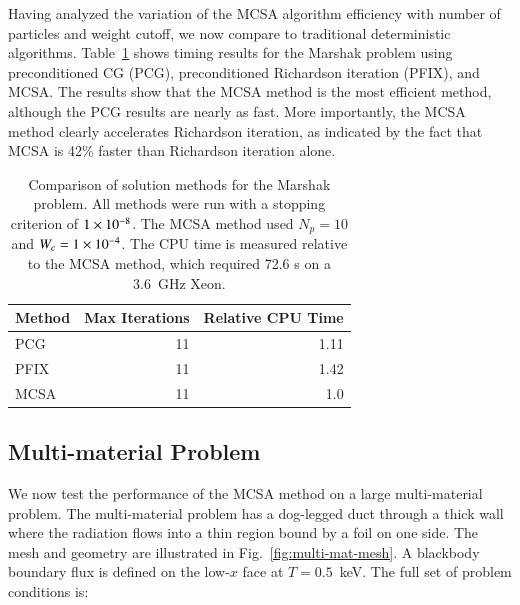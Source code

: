 \documentclass[preprint,12pt]{elsarticle}
\begin{document}
Having analyzed the variation of the MCSA algorithm efficiency with
number of particles and weight cutoff, we now compare to traditional
deterministic algorithms.  Table~\ref{tab:marshak_comparison} shows
timing results for the Marshak problem using preconditioned CG (PCG),
preconditioned Richardson iteration (PFIX), and MCSA. The results show
that the MCSA method is the most efficient method, although the PCG
results are nearly as fast.  More importantly, the MCSA method clearly
accelerates Richardson iteration, as indicated by the fact that MCSA
is 42\% faster than Richardson iteration alone.

\begin{table}[h!]
  \begin{center}
    \begin{tabular}{lrr}\hline\hline
      \multicolumn{1}{c}{Method} & \multicolumn{1}{c}{Max Iterations}
      & \multicolumn{1}{c}{Relative CPU Time}\\\hline\hline  PCG &
      11 & 1.11 \\  PFIX & 11 & 1.42 \\  MCSA & 11 & 1.0
      \\ \hline\hline
    \end{tabular}
  \end{center}
  \caption{Comparison of solution methods for the Marshak problem. All
    methods were run with a stopping criterion of $1\times 10^{-8}$.  The
    MCSA method used $N_p=10$ and $W_c = 1\times 10^{-4}$.  The CPU time is
    measured relative to the MCSA method, which required 72.6 s on a
    3.6~GHz Xeon.}
  \label{tab:marshak_comparison}
\end{table}

\subsection{Multi-material Problem}

We now test the performance of the MCSA method on a large
multi-material problem.  The multi-material problem has a dog-legged
duct through a thick wall where the radiation flows into a thin region
bound by a foil on one side.  The mesh and geometry are illustrated in
Fig.~\ref{fig:multi-mat-mesh}.  A blackbody boundary flux is defined
on the low-$x$ face at $T=0.5$~keV.  The full set of problem
conditions is:
\end{document}
